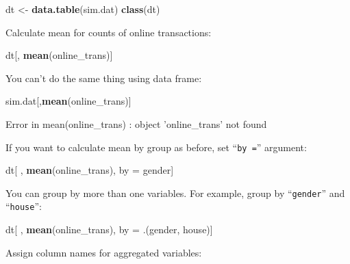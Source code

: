 \documentclass[12pt,]{krantz}
\makeatletter
\newenvironment{Shaded}{\begin{snugshade}}{\end{snugshade}}
\newcommand{\KeywordTok}[1]{\textcolor[rgb]{0.27,0.27,0.27}{\textbf{#1}}}
\newcommand{\StringTok}[1]{\textcolor[rgb]{0.5,0.5,0.5}{#1}}
\newcommand{\NormalTok}[1]{#1}
\newenvironment{kframe}{%
\medskip{}
\setlength{\fboxsep}{.8em}
 \def\at@end@of@kframe{}%
 \ifinner\ifhmode%
  \def\at@end@of@kframe{\end{minipage}}%
  \begin{minipage}{\columnwidth}%
 \fi\fi%
 \def\FrameCommand##1{\hskip\@totalleftmargin \hskip-\fboxsep
 \colorbox{shadecolor}{##1}\hskip-\fboxsep
     \hskip-\linewidth \hskip-\@totalleftmargin \hskip\columnwidth}%
 \MakeFramed {\advance\hsize-\width
   \@totalleftmargin\z@ \linewidth\hsize
   \@setminipage}}%
 {\par\unskip\endMakeFramed%
 \at@end@of@kframe}
\renewenvironment{Shaded}{\begin{kframe}}{\end{kframe}}
\theoremstyle{definition}
\theoremstyle{definition}
\theoremstyle{definition}
\theoremstyle{remark}
\makeatother
\begin{document}
\begin{Shaded}
\begin{Highlighting}[]
\NormalTok{dt <-}\StringTok{ }\KeywordTok{data.table}\NormalTok{(sim.dat)}
\KeywordTok{class}\NormalTok{(dt)}
\end{Highlighting}
\end{Shaded}

Calculate mean for counts of online transactions:

\begin{Shaded}
\begin{Highlighting}[]
\NormalTok{dt[, }\KeywordTok{mean}\NormalTok{(online_trans)]}
\end{Highlighting}
\end{Shaded}

You can't do the same thing using data frame:

\begin{Shaded}
\begin{Highlighting}[]
\NormalTok{sim.dat[,}\KeywordTok{mean}\NormalTok{(online_trans)]}
\end{Highlighting}
\end{Shaded}

\begin{Shaded}
\begin{Highlighting}[]
\NormalTok{Error in mean(online_trans) : object 'online_trans' not found}
\end{Highlighting}
\end{Shaded}

If you want to calculate mean by group as before, set ``\texttt{by\ =}''
argument:

\begin{Shaded}
\begin{Highlighting}[]
\NormalTok{dt[ , }\KeywordTok{mean}\NormalTok{(online_trans), by =}\StringTok{ }\NormalTok{gender]}
\end{Highlighting}
\end{Shaded}

You can group by more than one variables. For example, group by
``\texttt{gender}'' and ``\texttt{house}'':

\begin{Shaded}
\begin{Highlighting}[]
\NormalTok{dt[ , }\KeywordTok{mean}\NormalTok{(online_trans), by =}\StringTok{ }\NormalTok{.(gender, house)]}
\end{Highlighting}
\end{Shaded}

Assign column names for aggregated variables:
\end{document}
